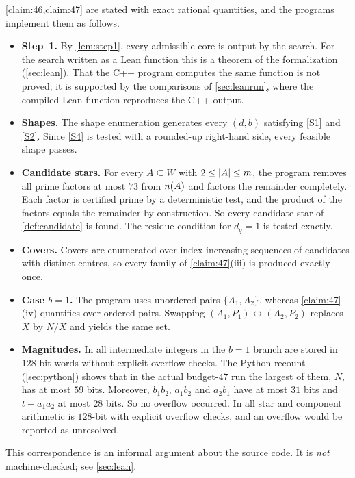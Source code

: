 \documentclass[11pt]{article}
\begin{document}
\cref{claim:46,claim:47} are stated with exact rational quantities, and the programs implement them as follows.
\begin{itemize}
\item \textbf{Step~1.} By \cref{lem:step1}, every admissible core is output by the search. For the search written as a Lean function this is a theorem of the formalization (\cref{sec:lean}). That the C++ program computes the same function is not proved; it is supported by the comparisons of \cref{sec:leanrun}, where the compiled Lean function reproduces the C++ output.
\item \textbf{Shapes.} The shape enumeration generates every $(d,b)$ satisfying \ref{S1} and \ref{S2}. Since \ref{S4} is tested with a rounded-up right-hand side, every feasible shape passes.
\item \textbf{Candidate stars.} For every $A\subseteq W$ with $2\le\lvert A\rvert\le m$, the program removes all prime factors at most $73$ from $n(A)$ and factors the remainder completely. Each factor is certified prime by a deterministic test, and the product of the factors equals the remainder by construction. So every candidate star of \cref{def:candidate} is found. The residue condition for $d_q=1$ is tested exactly.
\item \textbf{Covers.} Covers are enumerated over index-increasing sequences of candidates with distinct centres, so every family of \cref{claim:47}(iii) is produced exactly once.
\item \textbf{Case $b=1$.} The program uses unordered pairs $\{A_1,A_2\}$, whereas \cref{claim:47}(iv) quantifies over ordered pairs. Swapping $(A_1,P_1)\leftrightarrow(A_2,P_2)$ replaces $X$ by $N/X$ and yields the same set.
\item \textbf{Magnitudes.} In  all intermediate integers in the $b=1$ branch are stored in $128$-bit words without explicit overflow checks. The Python recount (\cref{sec:python}) shows that in the actual budget-$47$ run the largest of them, $N$, has at most $59$ bits. Moreover, $b_1b_2$, $a_1b_2$ and $a_2b_1$ have at most $31$ bits and $t+a_1a_2$ at most $28$ bits. So no overflow occurred. In  all star and component arithmetic is $128$-bit with explicit overflow checks, and an overflow would be reported as unresolved.
\end{itemize}
This correspondence is an informal argument about the source code. It is \emph{not} machine-checked; see \cref{sec:lean}.

\end{document}
